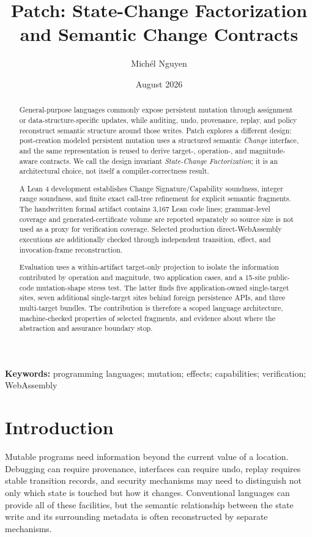 \documentclass[10pt]{article}
\title{Patch: State-Change Factorization and Semantic Change Contracts}
\author{Mich\'el Nguyen}
\date{August 2026}
\theoremstyle{plain}
\theoremstyle{remark}
\begin{document}
\maketitle

\begin{abstract}
General-purpose languages commonly expose persistent mutation through assignment or data-structure-specific updates, while auditing, undo, provenance, replay, and policy reconstruct semantic structure around those writes. Patch explores a different design: post-creation modeled persistent mutation uses a structured semantic \emph{Change} interface, and the same representation is reused to derive target-, operation-, and magnitude-aware contracts. We call the design invariant \emph{State-Change Factorization}; it is an architectural choice, not itself a compiler-correctness result.

A Lean 4 development establishes Change Signature/Capability soundness, integer range soundness, and finite exact call-tree refinement for explicit semantic fragments. The handwritten formal artifact contains 3,167 Lean code lines; grammar-level coverage and generated-certificate volume are reported separately so source size is not used as a proxy for verification coverage. Selected production direct-WebAssembly executions are additionally checked through independent transition, effect, and invocation-frame reconstruction.

Evaluation uses a within-artifact target-only projection to isolate the information contributed by operation and magnitude, two application cases, and a 15-site public-code mutation-shape stress test. The latter finds five application-owned single-target sites, seven additional single-target sites behind foreign persistence APIs, and three multi-target bundles. The contribution is therefore a scoped language architecture, machine-checked properties of selected fragments, and evidence about where the abstraction and assurance boundary stop.
\end{abstract}

\noindent\textbf{Keywords:} programming languages; mutation; effects; capabilities; verification; WebAssembly

\section{Introduction}
Mutable programs need information beyond the current value of a location. Debugging can require provenance, interfaces can require undo, replay requires stable transition records, and security mechanisms may need to distinguish not only which state is touched but how it changes. Conventional languages can provide all of these facilities, but the semantic relationship between the state write and its surrounding metadata is often reconstructed by separate mechanisms.
\end{document}
